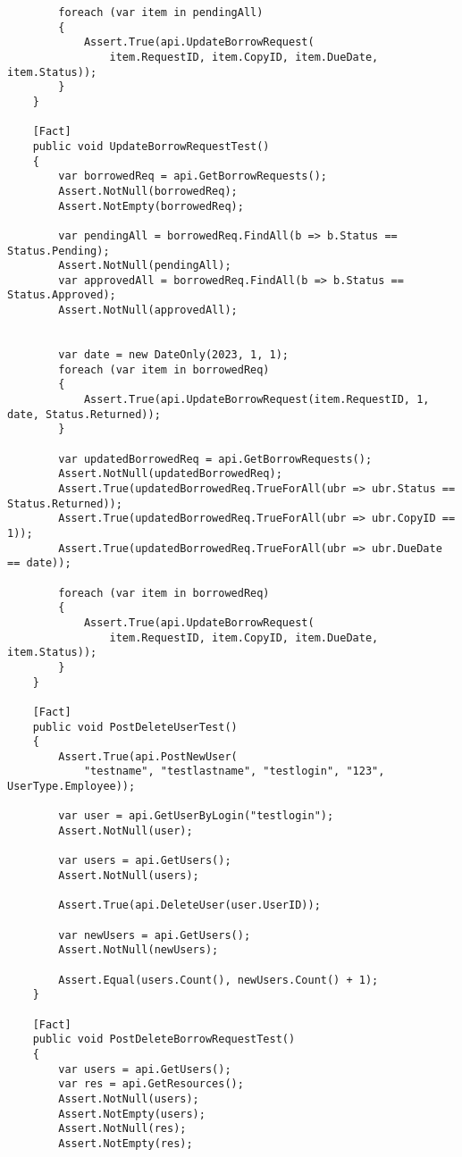 \begin{verbatim}
        foreach (var item in pendingAll)
        {
            Assert.True(api.UpdateBorrowRequest(
                item.RequestID, item.CopyID, item.DueDate, item.Status));
        }
    }

    [Fact]
    public void UpdateBorrowRequestTest()
    {
        var borrowedReq = api.GetBorrowRequests();
        Assert.NotNull(borrowedReq);
        Assert.NotEmpty(borrowedReq);

        var pendingAll = borrowedReq.FindAll(b => b.Status == Status.Pending);
        Assert.NotNull(pendingAll);
        var approvedAll = borrowedReq.FindAll(b => b.Status == Status.Approved);
        Assert.NotNull(approvedAll);


        var date = new DateOnly(2023, 1, 1);
        foreach (var item in borrowedReq)
        {
            Assert.True(api.UpdateBorrowRequest(item.RequestID, 1, date, Status.Returned));
        }

        var updatedBorrowedReq = api.GetBorrowRequests();
        Assert.NotNull(updatedBorrowedReq);
        Assert.True(updatedBorrowedReq.TrueForAll(ubr => ubr.Status == Status.Returned));
        Assert.True(updatedBorrowedReq.TrueForAll(ubr => ubr.CopyID == 1));
        Assert.True(updatedBorrowedReq.TrueForAll(ubr => ubr.DueDate == date));

        foreach (var item in borrowedReq)
        {
            Assert.True(api.UpdateBorrowRequest(
                item.RequestID, item.CopyID, item.DueDate, item.Status));
        }
    }

    [Fact]
    public void PostDeleteUserTest()
    {
        Assert.True(api.PostNewUser(
            "testname", "testlastname", "testlogin", "123", UserType.Employee));

        var user = api.GetUserByLogin("testlogin");
        Assert.NotNull(user);

        var users = api.GetUsers();
        Assert.NotNull(users);

        Assert.True(api.DeleteUser(user.UserID));

        var newUsers = api.GetUsers();
        Assert.NotNull(newUsers);

        Assert.Equal(users.Count(), newUsers.Count() + 1);
    }

    [Fact]
    public void PostDeleteBorrowRequestTest()
    {
        var users = api.GetUsers();
        var res = api.GetResources();
        Assert.NotNull(users);
        Assert.NotEmpty(users);
        Assert.NotNull(res);
        Assert.NotEmpty(res);


\end{verbatim}
